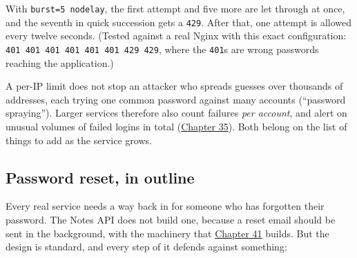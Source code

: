 \begin{codebox}[short]

\begin{Shaded}
\begin{Highlighting}[]
\NormalTok{\}}
\end{Highlighting}
\end{Shaded}

\end{codebox}

\noindent{}With \texttt{burst=5\ nodelay}, the first attempt and five more are let through at once, and the seventh in quick succession gets a \texttt{429}. After that, one attempt is allowed every twelve seconds. (Tested against a real Nginx with this exact configuration: \texttt{401\ 401\ 401\ 401\ 401\ 401\ 429\ 429}, where the \texttt{401}s are wrong passwords reaching the application.)

A per-IP limit does not stop an attacker who spreads guesses over thousands of addresses, each trying one common password against many accounts (``password spraying''). Larger services therefore also count failures \emph{per account}, and alert on unusual volumes of failed logins in total (\hyperref[ch:35-observability]{Chapter 35}). Both belong on the list of things to add as the service grows.

\subsection*{Password reset, in outline}\label{38-security:password-reset-in-outline}

Every real service needs a way back in for someone who has forgotten their password. The Notes API does not build one, because a reset email should be sent in the background, with the machinery that \hyperref[ch:41-event-driven-architecture]{Chapter 41} builds. But the design is standard, and every step of it defends against something:


